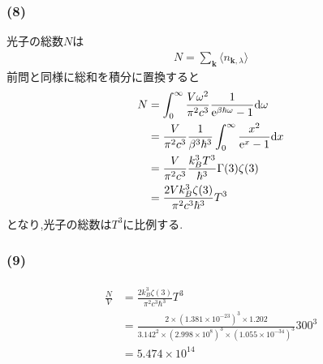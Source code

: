 \documentclass[uplatex,a4j,11pt,dvipdfmx]{jsarticle}
\begin{document}
\subsubsection*{(8)}
光子の総数$N$は
\begin{align}
  N=\sum_{\bm{k}}\langle n_{\bm{k},\lambda}\rangle
\end{align}
前問と同様に総和を積分に置換すると
\begin{align}
  \begin{split}
    N&=\int^\infty_0\frac{V\omega^2}{\pi^2c^3}\frac{1}{{\rm e}^{\beta\hbar\omega}-1}{\rm d}\omega\\
    &=\frac{V}{\pi^2c^3}\frac{1}{\beta^3\hbar^3}\int^\infty_0\frac{x^2}{{\rm e}^{x}-1}{\rm d}x\\
    &=\frac{V}{\pi^2c^3}\frac{k_B^3T^3}{\hbar^3}\Gamma(3)\zeta(3)\\
    &=\frac{2Vk_B^3\zeta(3)}{\pi^2c^3\hbar^3}T^3
  \end{split}
\end{align}
となり,光子の総数は$T^3$に比例する.
\subsubsection*{(9)}
\begin{align}
  \begin{split}
    \frac{N}{V}&=\frac{2k_B^3\zeta(3)}{\pi^2c^3\hbar^3}T^3\\
    &=\frac{2\times(1.381\times10^{-23})^3\times1.202}{3.142^2\times(2.998\times10^8)^3\times(1.055\times10^{-34})^3}300^3\\
    &=5.474\times10^{14}
  \end{split}
\end{align}
\end{document}
